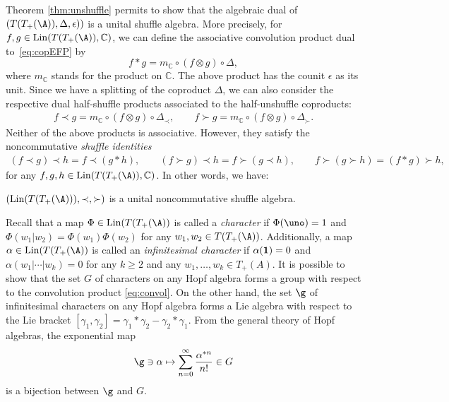 Theorem \ref{thm:unshuffle} permits to show that the algebraic dual of $(T(T_+(\A)),\Delta,\epsilon))$ is a unital shuffle algebra. More precisely, for $f,g\in \operatorname{Lin}(T(T_+(\A)),\mathbb{C})$, we can define the associative convolution product dual to~\eqref{eq:copEFP} by
\begin{equation}\label{eq:convol}
	f*g = m_{\mathbb{C}}\circ (f\otimes g)\circ \Delta,
\end{equation}
where $m_{\mathbb{C}}$ stands for the product on $\mathbb{C}$. The above product has the counit $\epsilon$ as its unit. Since we have a splitting of the coproduct $\Delta$, we can also consider the respective dual half-shuffle products associated to the half-unshuffle coproducts:
\begin{gather*}
	f\prec g
	= m_{\mathbb{C}}\circ (f\otimes g)\circ \Delta_{\prec},\qquad
	f\succ g
	= m_{\mathbb{C}}\circ (f\otimes g)\circ \Delta_{\succ}.
\end{gather*}
Neither of the above products is associative. However, they satisfy the noncommutative \textit{shuffle identities}
\begin{gather*}
	(f\prec g)\prec h =f\prec (g*h),\qquad\!
	(f\succ g)\prec h = f\succ (g\prec h),\qquad\!
	f\succ (g\succ h) = (f*g)\succ h,
\end{gather*}
for any $f,g,h\in \operatorname{Lin}(T(T_+(\A)),\mathbb{C})$. In other words, we have:
\begin{Proposition}
$(\operatorname{Lin}(T(T_+(\A))),\prec,\succ)$ is a unital noncommutative shuffle algebra.
\end{Proposition}

Recall that a map $\Phi \in \operatorname{Lin}(T(T_+(\A))$ is called a \textit{character} if $\Phi(\uno) = 1$ and $\Phi(w_1|w_2) = \Phi(w_1)\Phi(w_2)$ for any $w_1,w_2\in T(T_+(\A))$. Additionally, a map $\alpha \in \operatorname{Lin}(T(T_+(\A))$ is called an \textit{infinitesimal character} if $\alpha({\bf{1}}) = 0$ and $\alpha(w_1|\cdots| w_k) = 0$ for any $k\geq2$ and any $w_1,\dots,w_k \allowbreak \in T_+(A)$. It is possible to show that the set $G$ of characters on any Hopf algebra forms a group with respect to the convolution product \eqref{eq:convol}. On the other hand, the set $\g$ of infinitesimal characters on any Hopf algebra forms a Lie algebra with respect to the Lie bracket $[\gamma_1,\gamma_2] = \gamma_1*\gamma_2 - \gamma_2*\gamma_1$. From the general theory of Hopf algebras, the exponential map
\[
	 \g \ni \alpha \mapsto \sum_{n=0}^\infty \frac{\alpha^{*n}}{n!}\in G
 \]
is a bijection between $\g$ and $G$.

